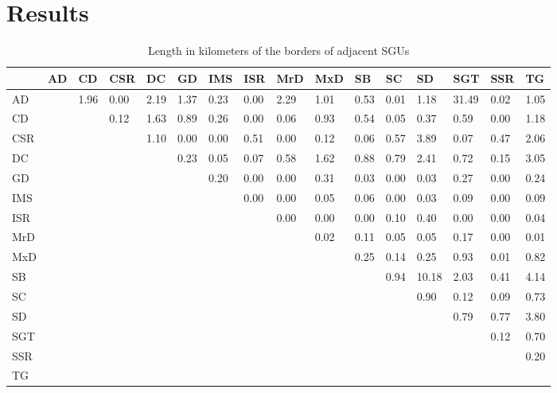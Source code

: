\documentclass[preprint,12pt,authoryear]{elsarticle}
\begin{document}
\section{Results}
\begin{table}[ht]
\centering
\small
\begin{tabular}{p{0.5cm}p{0.5cm}p{0.5cm}p{0.5cm}p{0.5cm}p{0.5cm}p{0.5cm}p{0.5cm}
p{0.5cm}p{0.5cm}p{0.5cm}p{0.5cm}p{0.5cm}p{0.5cm}p{0.5cm}p{0.5cm}}
  \hline
 & AD & CD & CSR & DC & GD & IMS & ISR & MrD & MxD & SB & SC & SD & SGT & SSR & TG \\ 
  \hline
AD &  & 1.96 & 0.00 & 2.19 & 1.37 & 0.23 & 0.00 & 2.29 & 1.01 & 0.53 & 0.01 & 1.18 & 31.49 & 0.02 & 1.05 \\ 
  CD &  &  & 0.12 & 1.63 & 0.89 & 0.26 & 0.00 & 0.06 & 0.93 & 0.54 & 0.05 & 0.37 & 0.59 & 0.00 & 1.18 \\ 
  CSR &  &  &  & 1.10 & 0.00 & 0.00 & 0.51 & 0.00 & 0.12 & 0.06 & 0.57 & 3.89 & 0.07 & 0.47 & 2.06 \\ 
  DC &  &  &  &  & 0.23 & 0.05 & 0.07 & 0.58 & 1.62 & 0.88 & 0.79 & 2.41 & 0.72 & 0.15 & 3.05 \\ 
  GD &  &  &  &  &  & 0.20 & 0.00 & 0.00 & 0.31 & 0.03 & 0.00 & 0.03 & 0.27 & 0.00 & 0.24 \\ 
  IMS &  &  &  &  &  &  & 0.00 & 0.00 & 0.05 & 0.06 & 0.00 & 0.03 & 0.09 & 0.00 & 0.09 \\ 
  ISR &  &  &  &  &  &  &  & 0.00 & 0.00 & 0.00 & 0.10 & 0.40 & 0.00 & 0.00 & 0.04 \\ 
  MrD &  &  &  &  &  &  &  &  & 0.02 & 0.11 & 0.05 & 0.05 & 0.17 & 0.00 & 0.01 \\ 
  MxD &  &  &  &  &  &  &  &  &  & 0.25 & 0.14 & 0.25 & 0.93 & 0.01 & 0.82 \\ 
  SB &  &  &  &  &  &  &  &  &  &  & 0.94 & 10.18 & 2.03 & 0.41 & 4.14 \\ 
  SC &  &  &  &  &  &  &  &  &  &  &  & 0.90 & 0.12 & 0.09 & 0.73 \\ 
  SD &  &  &  &  &  &  &  &  &  &  &  &  & 0.79 & 0.77 & 3.80 \\ 
  SGT &  &  &  &  &  &  &  &  &  &  &  &  &  & 0.12 & 0.70 \\ 
  SSR &  &  &  &  &  &  &  &  &  &  &  &  &  &  & 0.20 \\ 
  TG &  &  &  &  &  &  &  &  &  &  &  &  &  &  &  \\ 
   \hline
\end{tabular}
\caption{Length in kilometers of the borders of adjacent SGUs} 
\label{table:borderlength}
\end{table}
\end{document}
